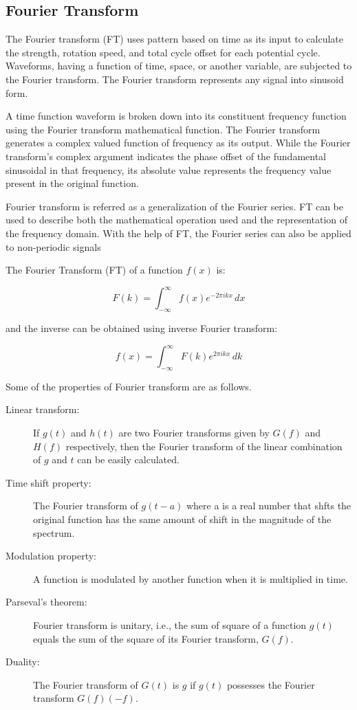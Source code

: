 \documentclass[a4paper, 12pt]{scrartcl}
\begin{document}
\subsection{Fourier Transform}
The Fourier transform (FT) uses pattern based on time as its input to calculate the strength, rotation speed, and total cycle offset for each potential cycle.
Waveforms, having a function of time, space, or another variable, are subjected to the Fourier transform.
The Fourier transform represents any signal into sinusoid form.

A time function waveform is broken down into its constituent frequency function using the Fourier transform mathematical function.
The Fourier transform generates a complex valued function of frequency as its output.
While the Fourier transform's complex argument indicates the phase offset of the fundamental sinusoidal in that frequency, its absolute value represents the frequency value present in the original function.

Fourier transform is referred as a generalization of the Fourier series.
FT can be used to describe both the mathematical operation used and the representation of the frequency domain.
With the help of FT, the Fourier series can also be applied to non-periodic signals

The Fourier Transform (FT) of a function $f(x)$ is:

\begin{equation}
  F(k) = \int^{\infty}_{-\infty} f(x) e^{-2 \pi i k x} \,dx
\end{equation}

and the inverse can be obtained using inverse Fourier transform:

\begin{equation}
  f(x) = \int^{\infty}_{-\infty} F(k) e^{2 \pi i k x} \,dk
\end{equation}

Some of the properties of Fourier transform are as follows.

\begin{description}
  \item[Linear transform:] If $g(t)$ and $h(t)$ are two Fourier transforms given by $G(f)$ and $H(f)$ respectively, then the Fourier transform of the linear combination of $g$ and $t$ can be easily calculated.
  \item[Time shift property:] The Fourier transform of $g(t - a)$ where a is a real number that shfts the original function has the same amount of shift in the magnitude of the spectrum.
  \item[Modulation property:] A function is modulated by another function when it is multiplied in time.
  \item[Parseval's theorem:] Fourier transform is unitary, i.e., the sum of square of a function $g(t)$ equals the sum of the square of its Fourier transform, $G(f)$.
  \item[Duality:] The Fourier transform of $G(t)$ is $g$ if $g(t)$ possesses the Fourier transform $G(f) (-f)$.
\end{description}
\end{document}
